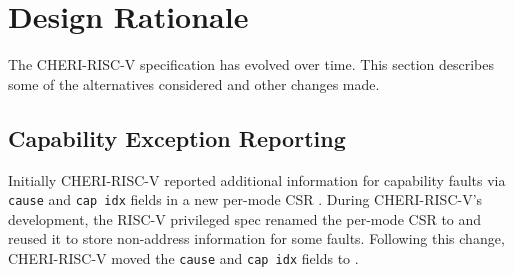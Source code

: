 


%


\section{Design Rationale}

The CHERI-RISC-V specification has evolved over time.  This section
describes some of the alternatives considered and other changes made.

\subsection{Capability Exception Reporting}

Initially CHERI-RISC-V reported additional information for capability
faults via \texttt{cause} and \texttt{cap idx} fields in a new
per-mode CSR \xccsr{}.  During CHERI-RISC-V's development, the RISC-V
privileged spec renamed the per-mode \xbadaddr{} CSR to \xtval{} and
reused it to store non-address information for some faults.  Following
this change, CHERI-RISC-V moved the \texttt{cause} and \texttt{cap
  idx} fields to \xtval{}.


